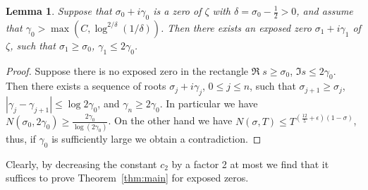 \documentclass{amsart}
\newtheorem{Lem}{Lemma}
\begin{document}
\begin{Lem}
\label{Lem:power sum}
Suppose that $\sigma_0+i\gamma_0$ is a zero of $\zeta$ with $\delta=\sigma_0-\frac{1}{2}>0$, and assume that $\gamma_0>\max(C, \log^{2/\delta}(1/\delta))$. Then there exists an exposed zero $\sigma_1+i\gamma_1$ of $\zeta$, such that $\sigma_1\geq\sigma_0$, $\gamma_1\leq2\gamma_0$.
\end{Lem}
\begin{proof}
Suppose there is no exposed zero in the rectangle $\Re\;s\geq\sigma_0$, $\Im s\leq 2\gamma_0$. Then there exists a sequence of roots $\sigma_j+i\gamma_j$, $0\leq j\leq n$, such that $\sigma_{j+1}\geq\sigma_j$, $|\gamma_j-\gamma_{j+1}|\leq \log 2\gamma_0$, and $\gamma_n\geq 2\gamma_0$. In particular we have $N(\sigma_0, 2\gamma_0)\geq\frac{2\gamma_0}{\log(2\gamma_0)}$. On the other hand we have $N(\sigma, T)\leq T^{\left(\frac{12}{5}+\epsilon\right)(1-\sigma)}$, thus, if $\gamma_0$ is sufficiently large we obtain a contradiction.
\end{proof}
Clearly, by decreasing the constant $c_2$ by a factor 2 at most we find that it suffices to prove Theorem~\ref{thm:main} for exposed zeros. 
\end{document}
